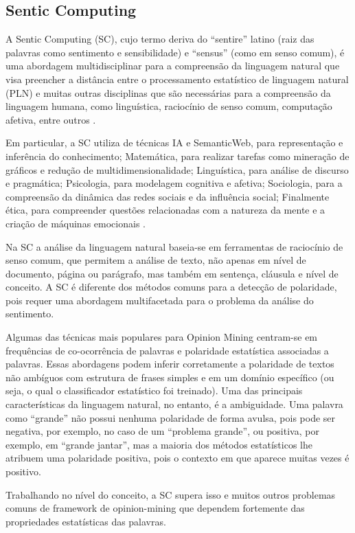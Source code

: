 \documentclass[
	12pt,				%
	openright,			%
	oneside,			%
	a4paper,			%
	english,			%
	spanish,			%
	brazil				%
	]{abntex2}
\begin{document}
\subsection{Sentic Computing}

A Sentic Computing (SC), cujo termo deriva do ``sentire'' latino (raiz das palavras como sentimento e sensibilidade) e ``sensus'' (como em senso comum),  é uma abordagem multidisciplinar para a compreensão da linguagem natural que visa preencher a distância entre o processamento estatístico de linguagem natural (PLN) e muitas outras disciplinas que são necessárias para a compreensão da linguagem humana, como linguística, raciocínio de senso comum, computação afetiva, entre outros \cite{book_Cambria2015}.

Em particular, a SC utiliza de técnicas IA e SemanticWeb, para representação e inferência do conhecimento; Matemática, para realizar tarefas como mineração de gráficos e redução de multidimensionalidade; Linguística, para análise de discurso e pragmática; Psicologia, para modelagem cognitiva e afetiva; Sociologia, para a compreensão da dinâmica das redes sociais e da influência social; Finalmente ética, para compreender questões relacionadas com a natureza da mente e a criação de máquinas emocionais \cite{inBook_Bisio2017}.

Na SC a análise da linguagem natural baseia-se em ferramentas de raciocínio de senso comum, que permitem a análise de texto, não apenas em nível de documento, página ou parágrafo, mas também em sentença, cláusula e nível de conceito. A SC é diferente dos métodos comuns para a detecção de polaridade, pois requer uma abordagem multifacetada para o problema da análise do sentimento.

Algumas das técnicas mais populares para Opinion Mining centram-se em frequências de co-ocorrência de palavras e polaridade estatística associadas a palavras. Essas abordagens podem inferir corretamente a polaridade de textos não ambíguos com estrutura de frases simples e em um domínio específico (ou seja, o qual o classificador estatístico foi treinado). Uma das principais características da linguagem natural, no entanto, é a ambiguidade. Uma palavra como ``grande'' não possui nenhuma polaridade de forma avulsa, pois pode ser negativa, por exemplo, no caso de um ``problema grande'', ou positiva, por exemplo, em ``grande jantar'', mas a maioria dos métodos estatísticos lhe atribuem uma polaridade positiva, pois o contexto em que aparece muitas vezes é positivo.

Trabalhando no nível do conceito, a SC supera isso e muitos outros problemas comuns de framework de opinion-mining que dependem fortemente das propriedades estatísticas das palavras. 
\end{document}

